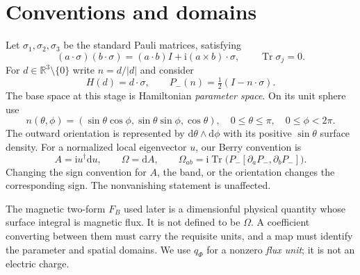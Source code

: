 \documentclass[11pt]{article}
\theoremstyle{definition}\newtheorem{definition}[theorem]{Definition}
\theoremstyle{remark}\newtheorem{remark}[theorem]{Remark}
\newcommand{\Tr}{\operatorname{Tr}}
\newcommand{\ii}{\mathrm{i}}
\newcommand{\dd}{\mathrm{d}}
\newcommand{\R}{\mathbb{R}}
\begin{document}
\section{Conventions and domains}
Let $\sigma_1,\sigma_2,\sigma_3$ be the standard Pauli matrices, satisfying
\begin{equation}\label{eq:pauli}
 (a\cdot\sigma)(b\cdot\sigma)=(a\cdot b)I+\ii(a\times b)\cdot\sigma,
 \qquad \Tr\sigma_j=0.
\end{equation}
For $d\in\R^3\setminus\{0\}$ write $n=d/|d|$ and consider
\begin{equation}\label{eq:h}
 H(d)=d\cdot\sigma,\qquad P_-(n)=\tfrac12(I-n\cdot\sigma).
\end{equation}
The base space at this stage is Hamiltonian \emph{parameter space}. On its unit sphere use
\begin{equation}\label{eq:n}
 n(\theta,\phi)=(\sin\theta\cos\phi,\sin\theta\sin\phi,\cos\theta),
 \quad 0\leq\theta\leq\pi,\quad 0\leq\phi<2\pi.
\end{equation}
The outward orientation is represented by $\dd\theta\wedge\dd\phi$ with its positive $\sin\theta$ surface density. For a normalized local eigenvector $u$, our Berry convention is
\begin{equation}\label{eq:berryconv}
 A=\ii u^\dagger\dd u,\qquad \Omega=\dd A,
 \qquad \Omega_{ab}=\ii\Tr\bigl(P_-[\partial_aP_-,\partial_bP_-]\bigr).
\end{equation}
Changing the sign convention for $A$, the band, or the orientation changes the corresponding sign. The nonvanishing statement is unaffected.

The magnetic two-form $F_B$ used later is a dimensionful physical quantity whose surface integral is magnetic flux. It is not defined to be $\Omega$. A coefficient converting between them must carry the requisite units, and a map must identify the parameter and spatial domains. We use $q_\Phi$ for a nonzero \emph{flux unit}; it is not an electric charge.
\end{document}
